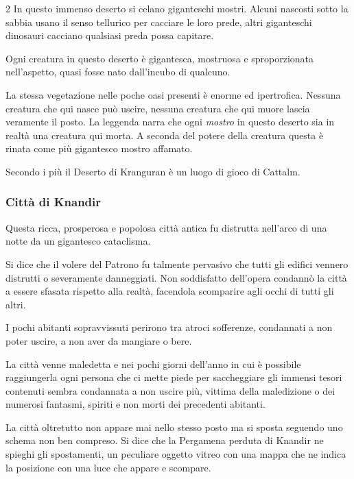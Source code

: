 \begin{multicols}{2}
In questo immenso deserto si celano giganteschi mostri. Alcuni nascosti sotto la sabbia usano il senso tellurico per cacciare le loro prede, altri giganteschi dinosauri cacciano qualsiasi preda possa capitare.

Ogni creatura in questo deserto è gigantesca, mostruosa e sproporzionata nell'aspetto, quasi fosse nato dall'incubo di qualcuno.

La stessa vegetazione nelle poche oasi presenti è enorme ed ipertrofica. Nessuna creatura che qui nasce può uscire, nessuna creatura che qui muore lascia veramente il posto. La leggenda narra che ogni \emph{mostro} in questo deserto sia in realtà una creatura qui morta. A seconda del potere della creatura questa è rinata come più gigantesco mostro affamato.

Secondo i più il Deserto di Kranguran è un luogo di gioco di Cattalm.

\subsubsection{Città di Knandir}

Questa ricca, prosperosa e popolosa città antica fu distrutta nell'arco di una notte da un gigantesco cataclisma.

Si dice che il volere del Patrono fu talmente pervasivo che tutti gli edifici vennero distrutti o severamente danneggiati. Non soddisfatto dell'opera condannò la città a essere sfasata rispetto alla realtà, facendola scomparire agli occhi di tutti gli altri.

I pochi abitanti sopravvissuti perirono tra atroci sofferenze, condannati a non poter uscire, a non aver da mangiare o bere.

La città venne maledetta e nei pochi giorni dell'anno in cui è possibile raggiungerla ogni persona che ci mette piede per saccheggiare gli immensi tesori contenuti sembra condannata a non uscire più, vittima della maledizione o dei numerosi fantasmi, spiriti e non morti dei precedenti abitanti.

La città oltretutto non appare mai nello stesso posto ma si sposta seguendo uno schema non ben compreso. Si dice che la Pergamena perduta di Knandir ne spieghi gli spostamenti, un peculiare oggetto vitreo con una mappa che ne indica la posizione con una luce che appare e scompare.



\end{multicols}
